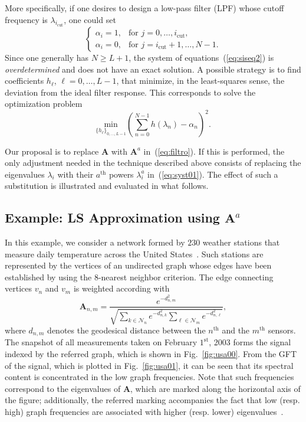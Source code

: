More specifically, if one desires to design a low-pass filter (LPF) whose cutoff frequency is $ \lambda_{i_\text{cut}} $, one could set
\begin{equation}
\label{eq:alfas}
\left\{\begin{array}{ll}
\alpha_i = 1, & \text{for } j = 0,\ldots, i_\text{cut},\\ 
\alpha_i = 0, & \text{for } j = i_\text{cut}+1,\ldots,N-1.
\end{array}\right.
\end{equation}
Since one generally has $ N \geq L+1$, the system of equations~(\ref{eq:siseq2}) is \emph{overdetermined} and does not have an exact solution. A possible strategy is to find coefficients $ h_\ell $, $ \ell=0, \dots, L-1 $, that minimize, in the least-squares sense, the deviation from the ideal filter response. This corresponds to solve the optimization problem
\begin{equation}
\label{eq:opt}
\underset{\{h_\ell\}_{0, \dots, L-1}}{\text{min}} \left( \sum_{n=0}^{N-1} h(\lambda_n) - \alpha_n \right)^2.
\end{equation}

Our proposal is to replace $\mathbf{A}$ with $\mathbf{A}^a$ in~(\ref{eq:filtro}). If this is performed, the only adjustment needed in the technique described above consists of replacing the eigenvalues $\lambda_i$ with their $a^{\text{th}}$ powers $\lambda_i^a$ in~(\ref{eq:syst01}). The effect of such a substitution is illustrated and evaluated in what follows.

\subsection{Example: LS Approximation using $\mathbf{A}^{{a}}$}\label{subsec:lsi01}
In this example, we consider a network formed by $230$ weather stations that measure daily temperature across the United States~\cite{data2011}. Such stations are represented by the vertices of an undirected graph whose edges have been established by using the $8$-nearest neighbor criterion.  The edge connecting vertices $v_n$ and $v_m$ is weighted according with
\begin{equation}
    \mathbf{A}_{n,m}=\frac{e^{-d^2_{n,m}}}{\sqrt{\sum_{k\in\mathcal{N}_n}e^{-d^2_{n,k}}\sum_{\ell\in\mathcal{N}_m}e^{-d^2_{n,\ell}}}},
\end{equation}
where $d_{n,m}$ denotes the geodesical distance between the $n^{\text{th}}$ and the $m^{\text{th}}$ sensors. The snapshot of all measurements taken on February $1^{\text{st}}$, 2003 forms the signal indexed by the referred graph, which is shown in Fig.~\ref{fig:usa00}. From the GFT of the signal, which is plotted in Fig.~\ref{fig:usa01}, it can be seen that its spectral content is concentrated in the low graph frequencies. Note that such frequencies correspond to the eigenvalues of $\mathbf{A}$, which are marked along the horizontal axis of the figure; additionally, the referred marking accompanies the fact that low (resp. high) graph frequencies are associated with higher (resp. lower) eigenvalues~\cite{sandryhaila2014frequency}.

